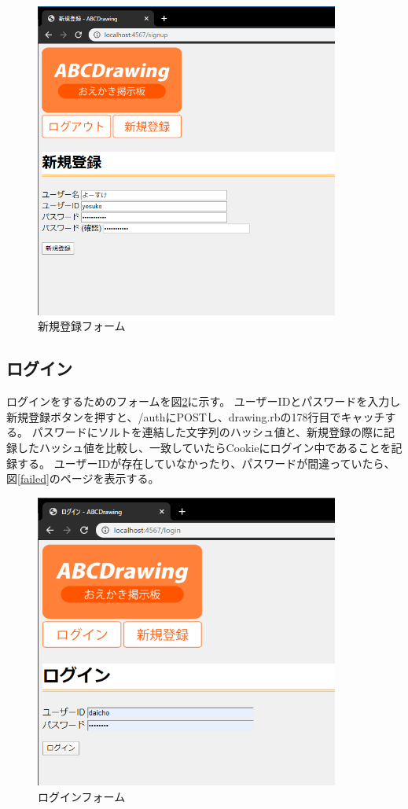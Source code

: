 \documentclass[a4j,titlepage]{jsarticle}
\begin{document}
\begin{figure}[H]
  \centering
  \includegraphics[width=10cm]{signup.png}
  \caption{新規登録フォーム}
  \label{signup}
\end{figure}

\subsection{ログイン}
ログインをするためのフォームを図\ref{login}に示す。
ユーザーIDとパスワードを入力し新規登録ボタンを押すと、/authにPOSTし、drawing.rbの178行目でキャッチする。
パスワードにソルトを連結した文字列のハッシュ値と、新規登録の際に記録したハッシュ値を比較し、一致していたらCookieにログイン中であることを記録する。
ユーザーIDが存在していなかったり、パスワードが間違っていたら、図\ref{failed}のページを表示する。

\begin{figure}[H]
  \centering
  \includegraphics[width=10cm]{login.png}
  \caption{ログインフォーム}
  \label{login}
\end{figure}
\end{document}

